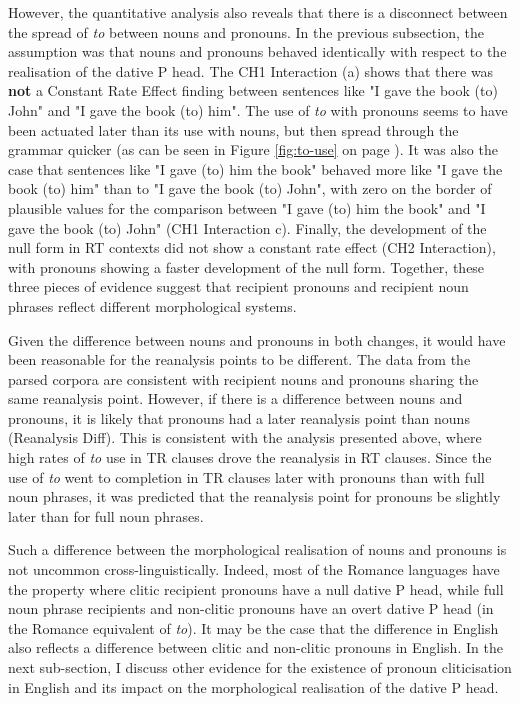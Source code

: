    However, the quantitative analysis also reveals that there is a disconnect between the spread of \textit{to} between nouns and pronouns. In the previous subsection, the assumption was that nouns and pronouns behaved identically with respect to the realisation of the dative P head. The CH1 Interaction (a) shows that there was \textbf{not} a Constant Rate Effect finding between sentences like "I gave the book (to) John" and "I gave the book (to) him". The use of \textit{to} with pronouns seems to have been actuated later than its use with nouns, but then spread through the grammar quicker (as can be seen in Figure \ref{fig:to-use} on page \pageref{fig:to-use}). It was also the case that sentences like "I gave (to) him the book" behaved more like "I gave the book (to) him" than to "I gave the book (to) John", with zero on the border of plausible values for the comparison between "I gave (to) him the book" and "I gave the book (to) John" (CH1 Interaction c). Finally, the development of the null form in RT contexts did not show a constant rate effect (CH2 Interaction), with pronouns showing a faster development of the null form. Together, these three pieces of evidence suggest that recipient pronouns and recipient noun phrases reflect different morphological systems.

   Given the difference between nouns and pronouns in both changes, it would have been reasonable for the reanalysis points to be different. The data from the parsed corpora are consistent with recipient nouns and pronouns sharing the same reanalysis point. However, if there is a difference between nouns and pronouns, it is likely that pronouns had a later reanalysis point than nouns (Reanalysis Diff). This is consistent with the analysis presented above, where high rates of \textit{to} use in TR clauses drove the reanalysis in RT clauses. Since the use of \textit{to} went to completion in TR clauses later with pronouns than with full noun phrases, it was predicted that the reanalysis point for pronouns be slightly later than for full noun phrases.

   Such a difference between the morphological realisation of nouns and pronouns is not uncommon cross-linguistically. Indeed, most of the Romance languages have the property where clitic recipient pronouns have a null dative P head, while full noun phrase recipients and non-clitic pronouns have an overt dative P head (in the Romance equivalent of \textit{to}). It may be the case that the difference in English also reflects a difference between clitic and non-clitic pronouns in English. In the next sub-section, I discuss other evidence for the existence of pronoun cliticisation in English and its impact on the morphological realisation of the dative P head.
    
